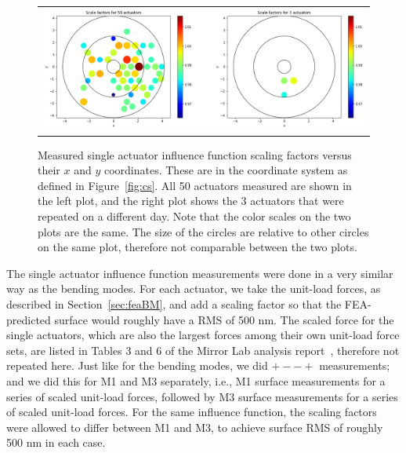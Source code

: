 \documentclass [twoside,openbib,12pt]{article}
\begin{document}
 \begin{figure}[bthp]
   \begin{center}
     \begin{tabular}{c}
\includegraphics[width=150mm]{figures/IFdist.png}
  \end{tabular}
   \end{center}
   \caption
   { \label{fig:IFdist}
     Measured single actuator influence function scaling factors
     versus their $x$ and $y$ coordinates. These are in the coordinate
     system as defined in Figure~\ref{fig:cs}.
     All 50 actuators measured are shown in the left plot, and the
     right plot shows the 3 actuators that were repeated on a
     different day.
Note that the color scales on the two plots are the same. The size of
the circles are relative to other circles on the same plot, therefore
not comparable between the two plots.
 }
\end{figure}

The single actuator influence function measurements were done in a
very similar way as the bending modes.
For each actuator, we take the unit-load forces, as described in
Section~\ref{sec:feaBM}, and add a
scaling factor so that the FEA-predicted surface would roughly have a
RMS of 500 nm.
The scaled force for the single actuators, which are also the largest
forces among their own unit-load force sets, are listed in Tables 3
and 6 of the Mirror Lab analysis report~\cite{m1m3UAreport}, therefore not repeated here.
Just like for the bending modes, we did $+--+$ measurements;
and we did
this for M1 and M3 separately,
i.e., M1 surface measurements for a series of scaled unit-load forces,
followed by M3 surface measurements for a series of scaled unit-load
forces.
For the same influence function,
the scaling factors were allowed to differ between M1 and M3, to
achieve surface RMS of roughly 500 nm in each case.
\end{document}
